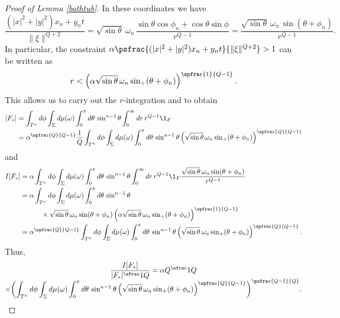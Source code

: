 \begin{proof}[Proof of Lemma \ref{bathtub}]
In these coordinates we have
\[
\frac{(|x|^2+|y|^2)x_n + y_n t}{\|\xi\|^{Q+2}} = \sqrt{\sin\theta}\ \omega_n\,\frac{\sin\theta \cos\phi_n + \cos\theta \sin\phi}{r^{Q-1}} = \frac{\sqrt{\sin\theta}\ \omega_n\,\sin(\theta+\phi_n)}{r^{Q-1}}.
\]
In particular, the constraint $\alpha \psfrac{(|x|^2+|y|^2)x_n + y_n t}{\|\xi\|^{Q+2}}>1$ can be written as
\[
r< \left(\alpha \sqrt{ \sin\theta}\,\omega_n \sin_+(\theta+\phi_n)\right)^\spfrac{1}{Q-1}.
\]
This allows us to carry out the $r$-integration and to obtain
\begin{align*}
|F_*| & = \int_{T^n} d\phi \int_\Sigma d\mu(\omega) \int_0^\pi d\theta \,\sin^{n-1}\theta
\int_0^\infty dr \,r^{Q-1} \1_F \\
& = \alpha^\spfrac{Q}{Q-1} \frac1Q \int_{T^n} d\phi \int_\Sigma d\mu(\omega) \int_0^\pi d\theta \,\sin^{n-1}\theta \left(\sqrt{ \sin\theta}\,\omega_n \sin_+(\theta+\phi_n)\right)^\spfrac{Q}{Q-1}
\end{align*}
and
\begin{align*}
I[F_*] & = \alpha \int_{T^n} d\phi \int_\Sigma d\mu(\omega) \int_0^\pi d\theta \,\sin^{n-1}\theta \int_0^\infty dr \,r^{Q-1} \1_F \frac{\sqrt{\sin\theta}\,\omega_n \sin(\theta+\phi_n)}{r^{Q-1}} \\
& = \alpha \int_{T^n} d\phi \int_\Sigma d\mu(\omega) \int_0^\pi d\theta \,\sin^{n-1}\theta \\
& \quad\quad\quad \times \sqrt{\sin\theta}\,\omega_n \sin(\theta+\phi_n)
\left(\alpha \sqrt{ \sin\theta}\,\omega_n \sin_+(\theta+\phi_n)\right)^\spfrac{1}{Q-1} \\
& = \alpha^\spfrac{Q}{Q-1} \int_{T^n} d\phi \int_\Sigma d\mu(\omega) \int_0^\pi d\theta \,\sin^{n-1}\theta \left(\sqrt{ \sin\theta}\,\omega_n \sin_+(\theta+\phi_n)\right)^\spfrac{Q}{Q-1}.
\end{align*}
Thus,
\begin{multline*}
\frac{I[F_*]}{|F_*|^\sfrac1Q} = \alpha Q^\sfrac1Q\\[-5pt]
\times \biggl(\int_{T^n} d\phi \int_\Sigma d\mu(\omega) \int_0^\pi d\theta \,\sin^{n-1}\theta \left(\sqrt{ \sin\theta}\,\omega_n \sin_+(\theta+\phi_n)\right)^\spfrac{Q}{Q-1}\biggr)^\psfrac{Q-1}{Q}.
\end{multline*}


\end{proof}
